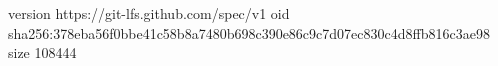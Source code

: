 version https://git-lfs.github.com/spec/v1
oid sha256:378eba56f0bbe41c58b8a7480b698c390e86c9c7d07ec830c4d8ffb816c3ae98
size 108444
